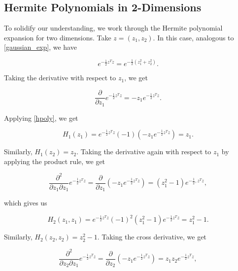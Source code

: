 \documentclass[11pt]{article}
\numberwithin{equation}{section}
\begin{document}
\begin{appendix}

\section{Hermite Polynomials in 2-Dimensions} \label{app:hermite2d}

To solidify our understanding, we work through the Hermite polynomial expansion for two dimensions. Take $z = (z_1, z_2)$. In this case, analogous to \eqref{gaussian_exp}, we have

\begin{equation}
e^{-\frac{1}{2} z^T z} = e^{-\frac{1}{2} (z_1^2 + z_2^2)}.
\end{equation}

Taking the derivative with respect to $z_1$, we get

\begin{equation*}
\frac{\partial}{\partial z_1} e^{-\frac{1}{2} z^T z} = -z_1 e^{-\frac{1}{2} z^T z}.
\end{equation*}

Applying \eqref{hpoly}, we get

\begin{equation}
H_1(z_1) = e^{-\frac{1}{2} z^T z} (-1) \left( -z_1 e^{-\frac{1}{2} z^T z} \right) = z_1.
\end{equation}

Similarly, $H_1(z_2) = z_2$. Taking the derivative again with respect to $z_1$ by applying the product rule, we get

\begin{equation*}
\frac{\partial^2}{\partial z_1 \partial z_1} e^{-\frac{1}{2} z^T z} = \frac{\partial}{\partial z_1} \left( -z_1 e^{-\frac{1}{2} z^T z} \right) = \left( z_1^2 - 1 \right) e^{-\frac{1}{2}, z^T z},
\end{equation*}

which gives us

\begin{equation}
H_2(z_1, z_1) = e^{-\frac{1}{2} z^T z} (-1)^2 (z_1^2 -1) e^{-\frac{1}{2} z^T z} = z_1^2 -1.
\end{equation}

Similarly, $H_2(z_2, z_2) = z_2^2 -1$. Taking the cross derivative, we get

\begin{equation*}
\frac{\partial^2}{\partial z_2 \partial z_1} e^{-\frac{1}{2} z^T z} = \frac{\partial}{\partial z_2} \left( -z_1 e^{-\frac{1}{2} z^T z} \right) =  z_1 z_2  e^{-\frac{1}{2} z^T z},
\end{equation*}


\end{appendix}
\end{document}
